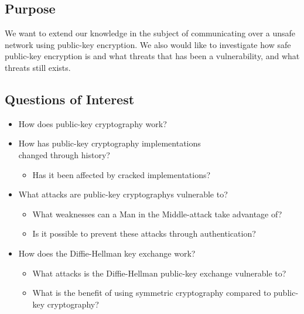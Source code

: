 \documentclass{acm_proc_article-sp}
\begin{document}

\subsection{Purpose}
We want to extend our knowledge in the subject of communicating over a unsafe network using public-key encryption. We also would like to investigate how safe public-key encryption is and what threats that has been a vulnerability, and what threats still exists. 


\subsection{Questions of Interest}
\begin{itemize} %
    \item How does public-key cryptography work? %
    \item How has public-key cryptography implementations\\ changed through history? %
    \begin{itemize}
        \item Has it been affected by cracked implementations?
    \end{itemize}
    \item What attacks are public-key cryptographys vulnerable to? %
    \begin{itemize} 
        \item What weaknesses can a Man in the Middle-attack take advantage of? %
        \item Is it possible to prevent these attacks through authentication? %
    \end{itemize}
    \item How does the Diffie-Hellman key exchange work? %
    \begin{itemize}
        \item What attacks is the Diffie-Hellman public-key exchange vulnerable to? %
        \item What is the benefit of using symmetric cryptography compared to public-key cryptography? %
    \end{itemize}
\end{itemize}
\end{document}
